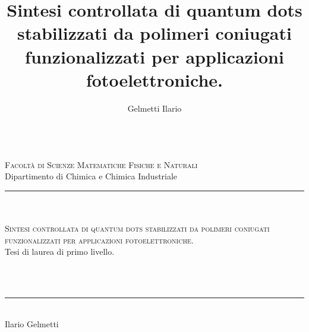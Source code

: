 \documentclass[a4paper, italian, 
, 12pt
, openright
]{book}
\title{Sintesi controllata di quantum dots stabilizzati da polimeri coniugati funzionalizzati per applicazioni fotoelettroniche.}
\author{Gelmetti Ilario}
\date{}%
\begin{document}
\frontmatter

\addtolength{\hoffset}{23pt}%
\begin{titlepage}

\begingroup	%
  \renewcommand{\thepage}{title}%


\begin{center}
	\\%
   	\large{\textsc{Facoltà di Scienze Matematiche Fisiche e Naturali}}\\
   	\large{{Dipartimento di Chimica e Chimica Industriale}}\\
		\rule{5cm}{1pt}\\
	
			\makebox[\textwidth]{\rule{0pt}{.22\textheight}}\\
	\LARGE{\textsc{Sintesi controllata di quantum dots stabilizzati da polimeri coniugati funzionalizzati per applicazioni fotoelettroniche.}}\\
	\bigskip
	\large{Tesi di laurea di primo livello.}\\	
		\makebox[.2\textwidth]{\rule{0pt}{.1\textheight}}\\
\end{center}

\vfill
\begin{small}
\makebox[\textwidth]{\rule{0pt}{.02\textheight}}\\
	\begin{center}
	\rule{3cm}{1pt}\\
	\LARGE{Ilario Gelmetti}\\		
	\end{center}
\end{small}

  \newpage%
 \endgroup%

\end{titlepage}
\end{document}
